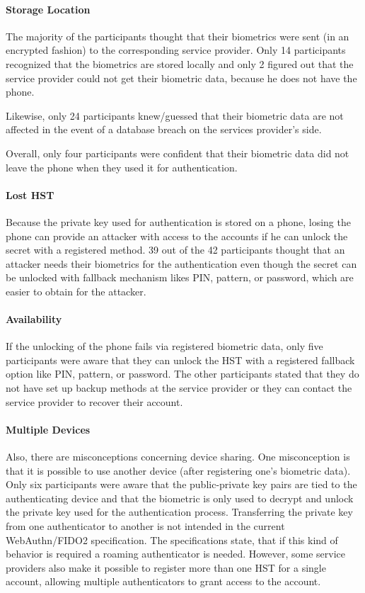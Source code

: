 \documentclass[runningheads]{llncs}
\begin{document}
\paragraph{Storage Location}
The majority of the participants thought that their biometrics were sent (in an encrypted fashion) to the corresponding service provider. Only 14 participants recognized that the biometrics are stored locally and only 2 figured out that the service provider could not get their biometric data, because he does not have the phone.

Likewise, only 24 participants knew/guessed that their biometric data are not affected in the event of a database breach on the services provider's side.

Overall, only four participants were confident that their biometric data did not leave the phone when they used it for authentication.

\paragraph{Lost HST}
Because the private key used for authentication is stored on a phone, losing the phone can provide an attacker with access to the accounts if he can unlock the secret with a registered method. 39 out of the 42 participants thought that an attacker needs their biometrics for the authentication even though the secret can be unlocked with fallback mechanism likes PIN, pattern, or password, which are easier to obtain for the attacker.

\paragraph{Availability}
If the unlocking of the phone fails via registered biometric data, only five participants were aware that they can unlock the HST with a registered fallback option like PIN, pattern, or password. The other participants stated that they do not have set up backup methods at the service provider or they can contact the service provider to recover their account.

\paragraph{Multiple Devices}
Also, there are misconceptions concerning device sharing. One misconception is that it is possible to use another device (after registering one's biometric data). Only six participants were aware that the public-private key pairs are tied to the authenticating device and that the biometric is only used to decrypt and unlock the private key used for the authentication process. Transferring the private key from one authenticator to another is not intended in the current WebAuthn/FIDO2 specification. The specifications state, that if this kind of behavior is required a roaming authenticator is needed. However, some service providers also make it possible to register more than one HST for a single account, allowing multiple authenticators to grant access to the account.
\end{document}
